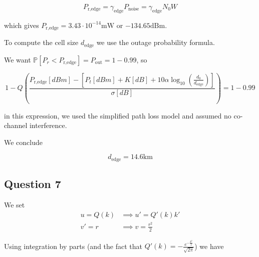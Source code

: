 \documentclass[]{article}
\begin{document}
	\begin{equation}
		P_{\text{r,edge}} = \gamma_{\text{edge}}P_{\text{noise}} = \gamma_{\text{edge}}N_0W
	\end{equation}
	
	which gives $P_{\text{r,edge}} = 3.43 \cdot 10^{-14}\mathrm{mW}$ or $-134.65\mathrm{dBm}$.
	
	To compute the cell size $d_{\text{edge}}$ we use the outage probability formula.
	
	We want $\mathbb{P}[P_r < P_{\text{r,edge}}] = P_{\text{out}} = 1 - 0.99$, so
	
	\begin{equation}
		1 - Q\left(\frac{P_{\text{r,edge}}[dBm] - \left[P_t[dBm] + K[dB] +  10\alpha\log_{10}\left(\frac{d_0}{d_{\text{edge}}}\right)\right]}{\sigma[dB]} \right) = 1 - 0.99
	\end{equation}
	
	in this expression, we used the simplified path loss model and assumed no co-channel interference.
	
	We conclude
	
	\begin{equation}
		d_{\text{edge}} = 14.6 \mathrm{km}
	\end{equation}
	
	\subsection*{Question 7}
	
	We set 
	\begin{align}
		u = Q(k) &\implies u' = Q'(k)k'\\
		v' = r &\implies v = \frac{r^2}{2}
	\end{align}
	
	Using integration by parts (and the fact that $Q'(k) = -\frac{e^{-\frac{k^2}{2}}}{\sqrt{2\pi}}$) we have
	
\end{document}
